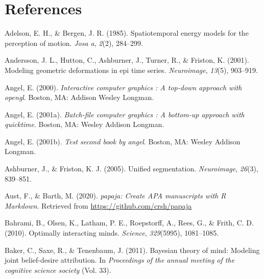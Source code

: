 \documentclass[12pt,twoside]{reedthesis}
\begin{document}
\hypertarget{references}{%
\chapter*{References}\label{references}}


\noindent

\setlength{\parindent}{-0.20in}
\setlength{\leftskip}{0.20in}
\setlength{\parskip}{8pt}

\hypertarget{refs}{}
\leavevmode\hypertarget{ref-adelson1985spatiotemporal}{}%
Adelson, E. H., \& Bergen, J. R. (1985). Spatiotemporal energy models for the perception of motion. \emph{Josa a}, \emph{2}(2), 284--299.

\leavevmode\hypertarget{ref-andersson2001modeling}{}%
Andersson, J. L., Hutton, C., Ashburner, J., Turner, R., \& Friston, K. (2001). Modeling geometric deformations in epi time series. \emph{Neuroimage}, \emph{13}(5), 903--919.

\leavevmode\hypertarget{ref-angel2000}{}%
Angel, E. (2000). \emph{Interactive computer graphics : A top-down approach with opengl}. Boston, MA: Addison Wesley Longman.

\leavevmode\hypertarget{ref-angel2001}{}%
Angel, E. (2001a). \emph{Batch-file computer graphics : A bottom-up approach with quicktime}. Boston, MA: Wesley Addison Longman.

\leavevmode\hypertarget{ref-angel2002a}{}%
Angel, E. (2001b). \emph{Test second book by angel}. Boston, MA: Wesley Addison Longman.

\leavevmode\hypertarget{ref-ashburner2005unified}{}%
Ashburner, J., \& Friston, K. J. (2005). Unified segmentation. \emph{Neuroimage}, \emph{26}(3), 839--851.

\leavevmode\hypertarget{ref-R-papaja}{}%
Aust, F., \& Barth, M. (2020). \emph{papaja: Create APA manuscripts with R Markdown}. Retrieved from \url{https://github.com/crsh/papaja}

\leavevmode\hypertarget{ref-bahrami2010optimally}{}%
Bahrami, B., Olsen, K., Latham, P. E., Roepstorff, A., Rees, G., \& Frith, C. D. (2010). Optimally interacting minds. \emph{Science}, \emph{329}(5995), 1081--1085.

\leavevmode\hypertarget{ref-baker2011bayesian}{}%
Baker, C., Saxe, R., \& Tenenbaum, J. (2011). Bayesian theory of mind: Modeling joint belief-desire attribution. In \emph{Proceedings of the annual meeting of the cognitive science society} (Vol. 33).
\end{document}
